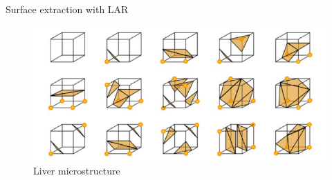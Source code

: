 \begin{frame}{Surface extraction with LAR}
\begin{figure}
    \centering
            \includegraphics[width=\textwidth]{figs/L16-marching-cubes.jpg}
    \caption{Liver microstructure\cite{Paoluzzi2016}}
    \label{fig:my_label}
\end{figure}
    
\end{frame}








